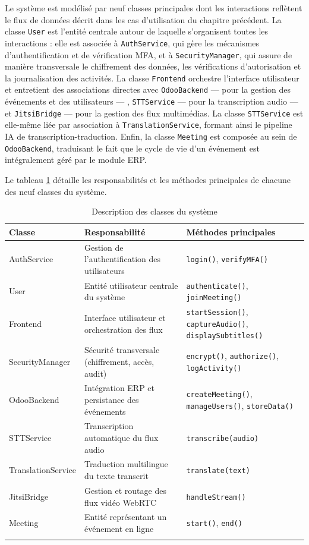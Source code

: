 Le système est modélisé par neuf classes principales dont les interactions reflètent le flux de données décrit dans les cas d'utilisation du chapitre précédent. La classe \texttt{User} est l'entité centrale autour de laquelle s'organisent toutes les interactions : elle est associée à \texttt{AuthService}, qui gère les mécanismes d'authentification et de vérification MFA, et à \texttt{SecurityManager}, qui assure de manière transversale le chiffrement des données, les vérifications d'autorisation et la journalisation des activités. La classe \texttt{Frontend} orchestre l'interface utilisateur et entretient des associations directes avec \texttt{OdooBackend} — pour la gestion des événements et des utilisateurs — , \texttt{STTService} — pour la transcription audio — et \texttt{JitsiBridge} — pour la gestion des flux multimédias. La classe \texttt{STTService} est elle-même liée par association à \texttt{TranslationService}, formant ainsi le pipeline IA de transcription-traduction. Enfin, la classe \texttt{Meeting} est composée au sein de \texttt{OdooBackend}, traduisant le fait que le cycle de vie d'un événement est intégralement géré par le module ERP.

Le tableau \ref{tab:classes} détaille les responsabilités et les méthodes principales de chacune des neuf classes du système.

\begin{longtable}{|m{3.5cm}|m{5.5cm}|m{4cm}|}
\hline
\textbf{Classe} & \textbf{Responsabilité} & \textbf{Méthodes principales} \\
\hline
\endhead
\endfoot
\endlastfoot
\hline
AuthService & Gestion de l'authentification des utilisateurs & \texttt{login()}, \texttt{verifyMFA()} \\
\hline
User & Entité utilisateur centrale du système & \texttt{authenticate()}, \texttt{joinMeeting()} \\
\hline
Frontend & Interface utilisateur et orchestration des flux & \texttt{startSession()}, \texttt{captureAudio()}, \texttt{displaySubtitles()} \\
\hline
SecurityManager & Sécurité transversale (chiffrement, accès, audit) & \texttt{encrypt()}, \texttt{authorize()}, \texttt{logActivity()} \\
\hline
OdooBackend & Intégration ERP et persistance des événements & \texttt{createMeeting()}, \texttt{manageUsers()}, \texttt{storeData()} \\
\hline
STTService & Transcription automatique du flux audio & \texttt{transcribe(audio)} \\
\hline
TranslationService & Traduction multilingue du texte transcrit & \texttt{translate(text)} \\
\hline
JitsiBridge & Gestion et routage des flux vidéo WebRTC & \texttt{handleStream()} \\
\hline
Meeting & Entité représentant un événement en ligne & \texttt{start()}, \texttt{end()} \\
\hline
\captionsetup{justification=centering,margin=2cm}
\caption{Description des classes du système}
\label{tab:classes}
\end{longtable}

